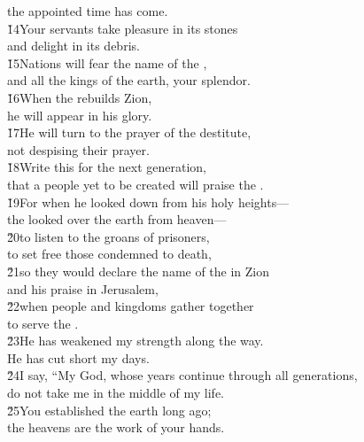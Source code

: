 \begin{poetry}
\poemlll       the appointed time has come. \\
\poeml \v{14}Your servants take pleasure in its stones \\
\poemll    and delight in its debris. \\
\poeml \v{15}Nations will fear the name of the , \\
\poemll    and all the kings of the earth, your splendor. \\
\poeml \v{16}When the  rebuilds Zion, \\
\poemll    he will appear in his glory. \\
\poeml \v{17}He will turn to the prayer of the destitute, \\
\poemll    not despising their prayer. \\
\poeml \v{18}Write this for the next generation, \\
\poemll    that a people yet to be created will praise the . \\
\poeml \v{19}For when he looked down from his holy heights--- \\
\poemll    the  looked over the earth from heaven--- \\
\poeml \v{20}to listen to the groans of prisoners, \\
\poemll    to set free those condemned to death, \\
\poeml \v{21}so they would declare the name of the  in Zion \\
\poemll    and his praise in Jerusalem, \\
\poeml \v{22}when people and kingdoms gather together \\
\poemll    to serve the . \\
\poeml \v{23}He has weakened my strength along the way. \\
\poemll    He has cut short my days. \\
\poeml \v{24}I say, ``My God, whose years continue through all generations, \\
\poemll    do not take me in the middle of my life. \\
\poeml \v{25}You established the earth long ago; \\
\poemll    the heavens are the work of your hands. \\

\end{poetry}
